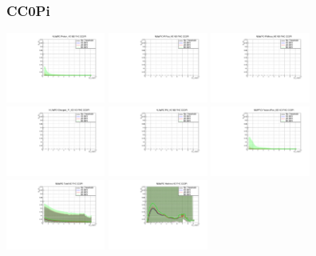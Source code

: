 \subsubsection{CC0Pi}

\begin{center}

  \includegraphics[width=0.245\textwidth]{plots/Elost_profiles/Proton_KE_FHC_CC0Pi.pdf}
  \includegraphics[width=0.245\textwidth]{plots/Elost_profiles/PiPlus_KE_FHC_CC0Pi.pdf}
  \includegraphics[width=0.245\textwidth]{plots/Elost_profiles/PiMinus_KE_FHC_CC0Pi.pdf}
  \includegraphics[width=0.245\textwidth]{plots/Elost_profiles/Charged_Pi_KE_FHC_CC0Pi.pdf}
  \includegraphics[width=0.245\textwidth]{plots/Elost_profiles/Pi0_KE_FHC_CC0Pi.pdf}
  \includegraphics[width=0.245\textwidth]{plots/Elost_profiles/Proton+Pion_KE_FHC_CC0Pi.pdf}
  \includegraphics[width=0.245\textwidth]{plots/Elost_profiles/Total_FHC_CC0Pi.pdf}
  \includegraphics[width=0.245\textwidth]{plots/Elost_profiles/Hadrons_FHC_CC0Pi.pdf}
  
\end{center}

